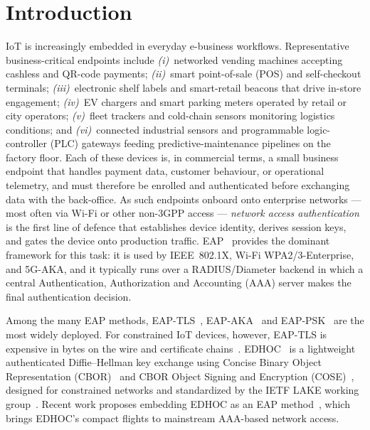 \documentclass{easychair}
\begin{document}
\section{Introduction}
\label{Introduction}
IoT is increasingly embedded in everyday e-business workflows.
Representative business-critical endpoints include
\emph{(i)}~networked vending machines accepting cashless and QR-code
payments;
\emph{(ii)}~smart point-of-sale (POS) and self-checkout terminals;
\emph{(iii)}~electronic shelf labels and smart-retail beacons that
drive in-store engagement;
\emph{(iv)}~EV chargers and smart parking meters operated by retail
or city operators;
\emph{(v)}~fleet trackers and cold-chain sensors monitoring logistics
conditions; and
\emph{(vi)}~connected industrial sensors and programmable
logic-controller (PLC) gateways feeding predictive-maintenance
pipelines on the factory floor.
Each of these devices is, in commercial terms, a small business
endpoint that handles payment data, customer behaviour, or
operational telemetry, and must therefore be enrolled and
authenticated before exchanging data with the back-office. As such
endpoints onboard onto enterprise networks --- most often via Wi-Fi
or other non-3GPP access --- \emph{network access authentication} is
the first line of defence that establishes device identity, derives
session keys, and gates the device onto production traffic. EAP~\cite{RFC3748}
provides the dominant framework for this task: it is used by
IEEE~802.1X, Wi-Fi WPA2/3-Enterprise, and 5G-AKA, and it typically
runs over a RADIUS/Diameter backend in which a central
Authentication, Authorization and Accounting (AAA) server makes the
final authentication decision.

Among the many EAP methods, EAP-TLS~\cite{RFC5216}, EAP-AKA~\cite{RFC4187}
and EAP-PSK~\cite{RFC4764} are the most widely deployed. For constrained
IoT devices, however, EAP-TLS is expensive in bytes on the wire and
certificate chains~\cite{FVW24,LopezGomez2026}. EDHOC~\cite{RFC9528,RFC9529}
is a lightweight authenticated Diffie--Hellman key exchange using
Concise Binary Object Representation (CBOR)~\cite{RFC8949} and
CBOR Object Signing and Encryption (COSE)~\cite{RFC9052}, designed
for constrained networks and standardized by the IETF LAKE working
group~\cite{LAKE}. Recent work proposes embedding EDHOC as an EAP
method~\cite{RFC-EAP-EDHOC,LopezGomez2026}, which brings EDHOC's
compact flights to mainstream AAA-based network access.
\end{document}
